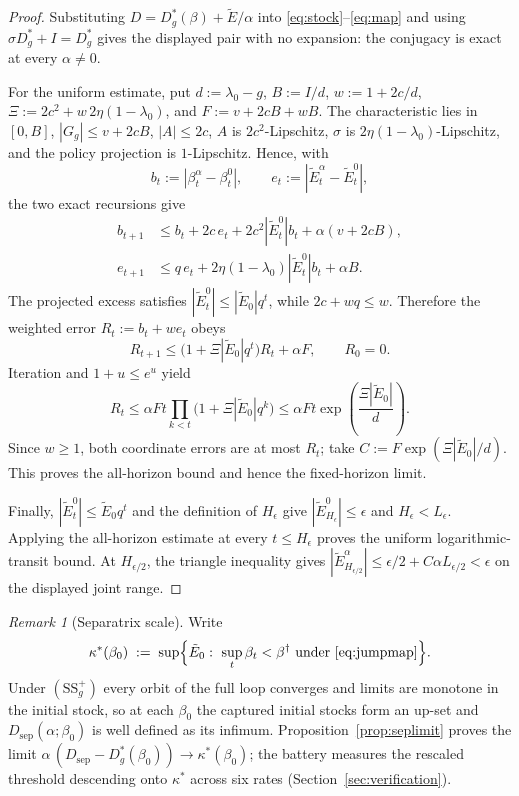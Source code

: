 \documentclass[11pt]{article}
\theoremstyle{definition}
\theoremstyle{remark}
\newtheorem{remark}[theorem]{Remark}
\numberwithin{equation}{section}
\begin{document}
\begin{proof}
Substituting $D = D^\ast_g(\beta) + \tilde E/\alpha$ into \eqref{eq:stock}--\eqref{eq:map} and using $\sigma D^\ast_g + I = D^\ast_g$ gives the displayed pair with no expansion: the conjugacy is exact at every $\alpha \neq 0$.

For the uniform estimate, put $d:=\lambda_0-g$, $B:=I/d$, $w:=1+2c/d$, $\Xi:=2c^2+w\,2\eta(1-\lambda_0)$, and $F:=v+2cB+wB$. The characteristic lies in $[0,B]$, $|G_g|\le v+2cB$, $|A|\le2c$, $A$ is $2c^2$-Lipschitz, $\sigma$ is $2\eta(1-\lambda_0)$-Lipschitz, and the policy projection is $1$-Lipschitz. Hence, with
\[
b_t:=|\beta_t^\alpha-\beta_t^0|,
\qquad e_t:=|\tilde E_t^\alpha-\tilde E_t^0|,
\]
the two exact recursions give
\[
\begin{aligned}
b_{t+1}&\le b_t+2c\,e_t+2c^2|\tilde E_t^0|b_t+\alpha(v+2cB),\\
e_{t+1}&\le q\,e_t+2\eta(1-\lambda_0)|\tilde E_t^0|b_t+\alpha B.
\end{aligned}
\]
The projected excess satisfies $|\tilde E_t^0|\le|\tilde E_0|q^t$, while $2c+wq\le w$. Therefore the weighted error $R_t:=b_t+w e_t$ obeys
\[
R_{t+1}\le\bigl(1+\Xi|\tilde E_0|q^t\bigr)R_t+\alpha F,
\qquad R_0=0.
\]
Iteration and $1+u\le e^u$ yield
\[
R_t\le \alpha Ft\prod_{k<t}\bigl(1+\Xi|\tilde E_0|q^k\bigr)
\le \alpha Ft\exp\!\left(\frac{\Xi|\tilde E_0|}{d}\right).
\]
Since $w\ge1$, both coordinate errors are at most $R_t$; take $C:=F\exp(\Xi|\tilde E_0|/d)$. This proves the all-horizon bound and hence the fixed-horizon limit.

Finally, $|\tilde E_t^0|\le\tilde E_0q^t$ and the definition of $H_\epsilon$ give $|\tilde E^0_{H_\epsilon}|\le\epsilon$ and $H_\epsilon<L_\epsilon$. Applying the all-horizon estimate at every $t\le H_\epsilon$ proves the uniform logarithmic-transit bound. At $H_{\epsilon/2}$, the triangle inequality gives $|\tilde E^\alpha_{H_{\epsilon/2}}|\le\epsilon/2+C\alpha L_{\epsilon/2}<\epsilon$ on the displayed joint range.
\end{proof}

\begin{remark}[Separatrix scale]\label{rem:sepscale}
Write
\[
\kappa^\ast(\beta_0)\;:=\;\sup\Bigl\{\tilde E_0:\ \sup_t\beta_t<\beta^\dagger\ \text{under \eqref{eq:jumpmap}}\Bigr\}.
\]
Under $(\mathrm{SS}^+_g)$ every orbit of the full loop converges and limits are monotone in the initial stock, so at each $\beta_0$ the captured initial stocks form an up-set and $D_{\mathrm{sep}}(\alpha;\beta_0)$ is well defined as its infimum. Proposition~\ref{prop:seplimit} proves the limit $\alpha\,(D_{\mathrm{sep}}-D^\ast_g(\beta_0))\to\kappa^\ast(\beta_0)$; the battery measures the rescaled threshold descending onto $\kappa^\ast$ across six rates (Section~\ref{sec:verification}).
\end{remark}
\end{document}
